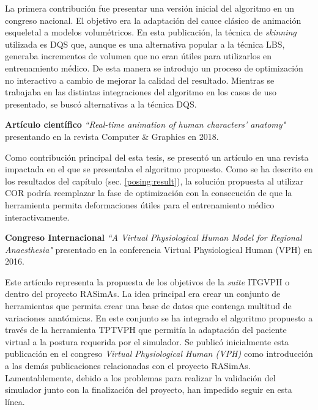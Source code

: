La primera contribución fue presentar una versión inicial del algoritmo en un congreso nacional. El objetivo era la adaptación del cauce clásico de animación esqueletal a modelos volumétricos. En esta publicación, la técnica de \emph{skinning} utilizada es \ac{DQS} que, aunque es una alternativa popular a la técnica \ac{LBS}, generaba incrementos de volumen que no eran útiles para utilizarlos en entrenamiento médico. De esta manera se introdujo un proceso de optimización no interactivo a cambio de mejorar la calidad del resultado. Mientras se trabajaba en las distintas integraciones del algoritmo en los casos de uso presentado, se buscó alternativas a la técnica \ac{DQS}.

\textbf{Artículo científico }\emph{``Real-time animation of human characters' anatomy"}\cite{SUJAR2018268} presentando en la revista Computer \& Graphics en 2018. 


Como contribución principal del esta tesis, se presentó un artículo en una revista impactada en el que se presentaba el algoritmo propuesto. Como se ha descrito en los resultados del capítulo (sec. \ref{posing:result}), la solución propuesta al utilizar \ac{COR} podría reemplazar la fase de optimización con la consecución de que la herramienta permita deformaciones útiles para el entrenamiento médico interactivamente.

\textbf{ Congreso Internacional }\emph{``A Virtual Physiological Human Model for Regional Anaesthesia"}\cite{VHZKLBSGSD16} presentado en la conferencia Virtual Physiological Human (VPH) en 2016.

Este artículo representa la propuesta de los objetivos de la \emph{suite} \ac{ITGVPH} o dentro del proyecto \ac{RASimAs}. La idea principal era crear un conjunto de herramientas que permita crear una base de datos que contenga multitud de variaciones anatómicas. En este conjunto se ha integrado el algoritmo propuesto a través de la herramienta \ac{TPTVPH} que permitía la adaptación del paciente virtual a la postura requerida por el simulador. Se publicó inicialmente esta publicación en el congreso \emph{ Virtual Physiological Human (VPH)} como introducción a las demás publicaciones relacionadas con el proyecto \ac{RASimAs}. Lamentablemente, debido a los problemas para realizar la validación del simulador junto con la finalización del proyecto, han  impedido seguir en esta línea. %

